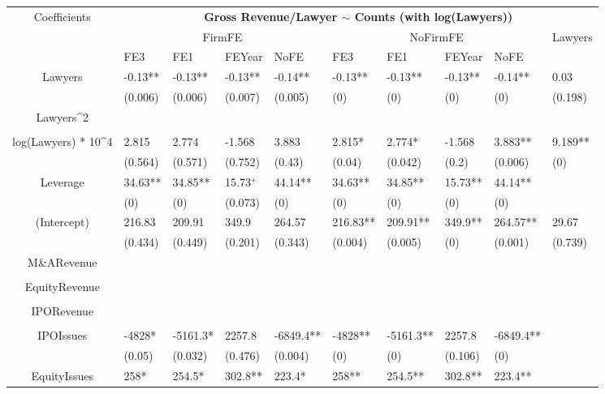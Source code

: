 \documentclass{article}
\begin{document}
\begin{table}[H]
\centering
\begin{tabular}{|clllllllll|}
\hline
\multirow{3}{*}{Coefficients} & \multicolumn{9}{c|}{\textbf{Gross Revenue/Lawyer $\sim$ Counts (with log(Lawyers))}} \\
\cline{2-10}
& \multicolumn{4}{c}{FirmFE} & \multicolumn{4}{c}{NoFirmFE} & \multirow{2}{*}{Lawyers} \\
\cline{2-9}
& FE3 & FE1 & FEYear & NoFE & FE3 & FE1 & FEYear & NoFE &  \\
\hline
 
Lawyers & -0.13** & -0.13** & -0.13** & -0.14** & -0.13** & -0.13** & -0.13** & -0.14** & 0.03 \\ 
   & (0.006) & (0.006) & (0.007) & (0.005) & (0) & (0) & (0) & (0) & (0.198) \\ 
  Lawyers^2 &  &  &  &  &  &  &  &  &  \\ 
   &  &  &  &  &  &  &  &  &  \\ 
  log(Lawyers) * 10^4 & 2.815 & 2.774 & -1.568 & 3.883 & 2.815* & 2.774* & -1.568 & 3.883** & 9.189** \\ 
   & (0.564) & (0.571) & (0.752) & (0.43) & (0.04) & (0.042) & (0.2) & (0.006) & (0) \\ 
  Leverage & 34.63** & 34.85** & 15.73$^{+}$ & 44.14** & 34.63** & 34.85** & 15.73** & 44.14** &  \\ 
   & (0) & (0) & (0.073) & (0) & (0) & (0) & (0) & (0) &  \\ 
  (Intercept) & 216.83 & 209.91 & 349.9 & 264.57 & 216.83** & 209.91** & 349.9** & 264.57** & 29.67 \\ 
   & (0.434) & (0.449) & (0.201) & (0.343) & (0.004) & (0.005) & (0) & (0.001) & (0.739) \\ 
  M\&ARevenue &  &  &  &  &  &  &  &  &  \\ 
   &  &  &  &  &  &  &  &  &  \\ 
  EquityRevenue &  &  &  &  &  &  &  &  &  \\ 
   &  &  &  &  &  &  &  &  &  \\ 
  IPORevenue &  &  &  &  &  &  &  &  &  \\ 
   &  &  &  &  &  &  &  &  &  \\ 
  IPOIssues & -4828* & -5161.3* & 2257.8 & -6849.4** & -4828** & -5161.3** & 2257.8 & -6849.4** &  \\ 
   & (0.05) & (0.032) & (0.476) & (0.004) & (0) & (0) & (0.106) & (0) &  \\ 
  EquityIssues & 258* & 254.5* & 302.8** & 223.4* & 258** & 254.5** & 302.8** & 223.4** &  \\ 

\end{tabular}
\end{table}
\end{document}
